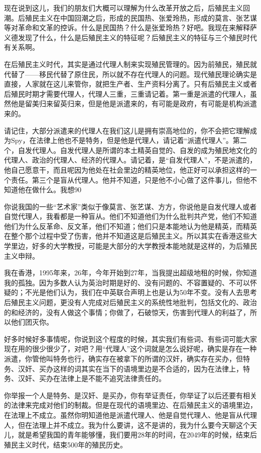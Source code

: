 \documentclass[UTF8, 12pt, a4paper]{ctexrep}
\begin{document}
现在说到这儿，我们的朋友们大概可以理解为什么改革开放之后，后殖民主义回潮。后殖民主义在中国回潮之后，形成的民国热、张爱玲热，形成的莫言、张艺谋等对革命和文革的控诉。什么是民国热？什么是张爱玲热？好吧。我现在来解释萨义德发现了什么，什么是后殖民主义的特征呢？后殖民主义的特征与三个殖民时代有关系啊。

在后殖民主义时代，其实是通过代理人制来实现殖民管理的。因为前殖民，殖民就代替了——移民代替了原住民，所以就不存在代理人的问题。现代殖民理论确实是直接，人家就在这儿来管你，就把生产者、生产资料分离了。只有后殖民主义或者后殖民时期才需要代理人，代理人三重，三重请记着。第一重是派遣的代理人，虽然他是留美归来留英归来，但是他是派遣来的，有可能是政府，有可能是机构派遣来的。

请记住，大部分派遣来的代理人在我们这儿是拥有崇高地位的，你不会把它理解成为Spy，在法律上他也不是特务，但是他是代理人，请记着“派遣代理人”。第二个，自发代理人。自发代理人是所谓的本土精英自觉的、自发的成为殖民地文化的代理人、政治的代理人、经济的代理人。请记着，是“自发代理人”，不是派遣的，他自己愿意干，而且呢因为他处在社会里边的精英地位，他正好可以承担这样的一个责任。第三个是盲从代理人。他并不知道，只是他不小心做了这件事儿，但他不知道他在做什么。我想90%

你说我国的一些“艺术家”类似于像莫言、张艺谋、方方，你说他是自发代理人或者自觉代理人，我看都是一种盲从。他们不知道他们为什么批判共产党，他们不知道他们为什么反革命、反文革，他们不知道；他们只是本能地认为他是精英，而精英在整个那个过程中受了伤害，他并不知道这是后殖民主义。所以其实在香港这些大学里边，好多的大学教授，可能是大部分的大学教授本能地就是这样的，为后殖民主义申辩。

我在香港，1995年来，26年，今年开始到27年，当我提出超级地租的时候，你知道我的孤独。因为多数人认为英治时期是好的、没有问题的、不容置疑的、不可以怀疑的；不光是他们认为，我们在中英联合声明上也是认为50年不变。没有人去思考后殖民主义问题，更没有人完成对后殖民主义的系统性地批判，包括文化的、政治的和经济的，没有人做这个事情；你做了，石破惊天，伤害到代理人的利益了，所以他们团灭你。

好多时候好多事情呢，你说到这个程度的时候，其实我们有些词、有些词可能大家现在用的很少很少了，对吧？用“代理人”这个词就是怎么说好呢，确实是存在一种派遣，你管他叫特务也行，确实存在被拿下的所谓的汉奸，确实存在买办，但特务、汉奸、买办这样的词其实在当下的语境里边是不合适的，因为在法律上，特务、汉奸、买办在法律上是不能不追究法律责任的。

你举报一个人是特务、是汉奸、是买办，你有举证责任，你举证了以后还要有相关的法律来完成对他们的制裁。但是在现代的语境里边、在后殖民主义的语境里边，在法理上不成立。虽然你明知道他是派遣代理人、他是自觉代理人、他是盲从代理人，但在法理上并不成立。我为什么要讲，这不是讲的，我为什么要今天聊这个天儿，就是希望我国的青年能够懂，我们要用28年的时间，在2049年的时候，结束后殖民主义时代，结束500年的殖民历史。
\end{document}
